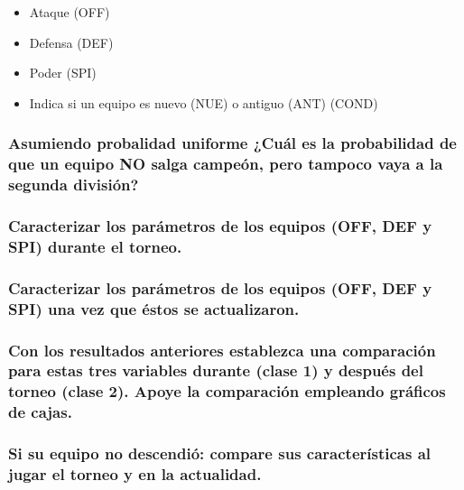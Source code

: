\documentclass[]{article}
\providecommand{\tightlist}{%
  \setlength{\itemsep}{0pt}\setlength{\parskip}{0pt}}
\begin{document}
\begin{itemize}
\tightlist
\item
  Ataque (OFF)
\item
  Defensa (DEF)
\item
  Poder (SPI)
\item
  Indica si un equipo es nuevo (NUE) o antiguo (ANT) (COND)
\end{itemize}

\hypertarget{asumiendo-probalidad-uniforme-cual-es-la-probabilidad-de-que-un-equipo-no-salga-campeon-pero-tampoco-vaya-a-la-segunda-division}{%
\subsubsection{Asumiendo probalidad uniforme ¿Cuál es la probabilidad de
que un equipo NO salga campeón, pero tampoco vaya a la segunda
división?}\label{asumiendo-probalidad-uniforme-cual-es-la-probabilidad-de-que-un-equipo-no-salga-campeon-pero-tampoco-vaya-a-la-segunda-division}}

\hypertarget{caracterizar-los-parametros-de-los-equipos-off-def-y-spi-durante-el-torneo.}{%
\subsubsection{Caracterizar los parámetros de los equipos (OFF, DEF y
SPI) durante el
torneo.}\label{caracterizar-los-parametros-de-los-equipos-off-def-y-spi-durante-el-torneo.}}

\hypertarget{caracterizar-los-parametros-de-los-equipos-off-def-y-spi-una-vez-que-estos-se-actualizaron.}{%
\subsubsection{Caracterizar los parámetros de los equipos (OFF, DEF y
SPI) una vez que éstos se
actualizaron.}\label{caracterizar-los-parametros-de-los-equipos-off-def-y-spi-una-vez-que-estos-se-actualizaron.}}

\hypertarget{con-los-resultados-anteriores-establezca-una-comparacion-para-estas-tres-variables-durante-clase-1-y-despues-del-torneo-clase-2.-apoye-la-comparacion-empleando-graficos-de-cajas.}{%
\subsubsection{Con los resultados anteriores establezca una comparación
para estas tres variables durante (clase 1) y después del torneo (clase
2). Apoye la comparación empleando gráficos de
cajas.}\label{con-los-resultados-anteriores-establezca-una-comparacion-para-estas-tres-variables-durante-clase-1-y-despues-del-torneo-clase-2.-apoye-la-comparacion-empleando-graficos-de-cajas.}}

\hypertarget{si-su-equipo-no-descendio-compare-sus-caracteristicas-al-jugar-el-torneo-y-en-la-actualidad.}{%
\subsubsection{Si su equipo no descendió: compare sus características al
jugar el torneo y en la
actualidad.}\label{si-su-equipo-no-descendio-compare-sus-caracteristicas-al-jugar-el-torneo-y-en-la-actualidad.}}
\end{document}
